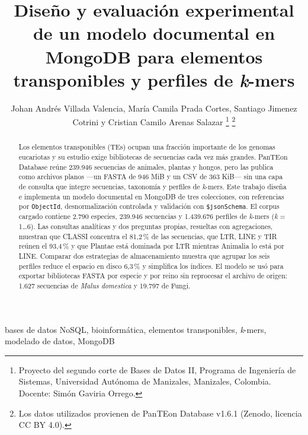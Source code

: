 \documentclass[journal]{IEEEtran}
\begin{document}
\title{Diseño y evaluación experimental de un modelo documental en MongoDB
para elementos transponibles y perfiles de \textit{k}-mers}

\author{
  Johan Andrés Villada Valencia, María Camila Prada Cortes,
  Santiago Jimenez Cotrini y Cristian Camilo Arenas Salazar%
  \thanks{Proyecto del segundo corte de Bases de Datos II, Programa de Ingeniería de
  Sistemas, Universidad Autónoma de Manizales, Manizales, Colombia. Docente: Simón
  Gaviria Orrego.}%
  \thanks{Los datos utilizados provienen de PanTEon Database v1.6.1 (Zenodo, licencia
  CC BY 4.0).}%
}

\maketitle

\begin{abstract}
Los elementos transponibles (TEs) ocupan una fracción importante de los genomas
eucariotas y su estudio exige bibliotecas de secuencias cada vez más grandes. PanTEon
Database reúne 239.946 secuencias de animales, plantas y hongos, pero las publica como
archivos planos ---un FASTA de 946 MiB y un CSV de 363 KiB--- sin una capa de consulta que
integre secuencias, taxonomía y perfiles de \textit{k}-mers. Este trabajo diseña e
implementa un modelo documental en MongoDB de tres colecciones, con referencias por
\texttt{ObjectId}, desnormalización controlada y validación con \texttt{\$jsonSchema}. El
corpus cargado contiene 2.790 especies, 239.946 secuencias y 1.439.676 perfiles de
\textit{k}-mers (\textit{k} = 1\ldots6). Las consultas analíticas y dos preguntas propias,
resueltas con agregaciones, muestran que CLASSI concentra el 81,2\,\% de las secuencias,
que LTR, LINE y TIR reúnen el 93,4\,\% y que Plantae está dominada por LTR mientras
Animalia lo está por LINE. Comparar dos estrategias de almacenamiento muestra que agrupar
los seis perfiles reduce el espacio en disco 6,3\,\% y simplifica los índices. El modelo
se usó para exportar bibliotecas FASTA por especie y por reino sin reprocesar el archivo
de origen: 1.627 secuencias de \textit{Malus domestica} y 19.797 de Fungi.
\end{abstract}

\begin{IEEEkeywords}
bases de datos NoSQL, bioinformática, elementos transponibles, \textit{k}-mers,
modelado de datos, MongoDB
\end{IEEEkeywords}
\end{document}
